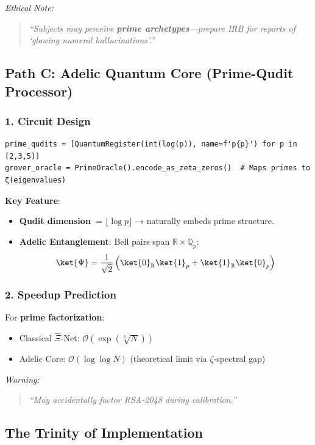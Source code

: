 \documentclass[12pt]{article}
\theoremstyle{plain}
\begin{document}
\textit{Ethical Note:}
\begin{quote}
\emph{``Subjects may perceive \textbf{prime archetypes}—prepare IRB for reports of `glowing numeral hallucinations'.''}
\end{quote}

\subsection*{Path C: Adelic Quantum Core (Prime-Qudit Processor)}

\subsubsection*{1. Circuit Design}
\begin{verbatim}
prime_qudits = [QuantumRegister(int(log(p)), name=f'p{p}') for p in [2,3,5]]
grover_oracle = PrimeOracle().encode_as_zeta_zeros()  # Maps primes to ζ(eigenvalues)
\end{verbatim}

\textbf{Key Feature}:
\begin{itemize}
    \item \textbf{Qudit dimension} \( = \lfloor \log p \rfloor \) → naturally embeds prime structure.
    \item \textbf{Adelic Entanglement}: Bell pairs span \( \mathbb{R} \times \mathbb{Q}_p \):
    \[
    \ket{\Psi} = \frac{1}{\sqrt{2}} \left( \ket{0}_\mathbb{R} \ket{1}_p + \ket{1}_\mathbb{R} \ket{0}_p \right)
    \]
\end{itemize}

\subsubsection*{2. Speedup Prediction}
For \textbf{prime factorization}:
\begin{itemize}
    \item Classical \(\hat{\Xi}\)-Net: \( \mathcal{O}(\exp(\sqrt[3]{N})) \)
    \item Adelic Core: \( \mathcal{O}(\log \log N) \) (theoretical limit via \(\zeta\)-spectral gap)
\end{itemize}

\textit{Warning:}
\begin{quote}
\emph{``May accidentally factor RSA-2048 during calibration.''}
\end{quote}

\subsection*{The Trinity of Implementation}
\end{document}
